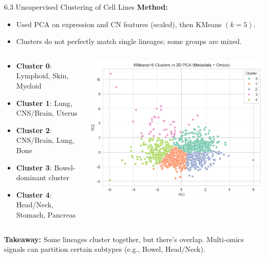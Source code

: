 \documentclass[10pt]{beamer}
\begin{document}
\begin{frame}{6.3 Unsupervised Clustering of Cell Lines}
  \textbf{Method:}
  \begin{itemize}
    \item Used PCA on expression and CN features (scaled), then KMeans \((k=5)\).
    \item Clusters do not perfectly match single lineages; some groups are mixed.
  \end{itemize}

  \begin{columns}
    \begin{column}{0.5\linewidth}
      \begin{itemize}
        \item \textbf{Cluster 0}: Lymphoid, Skin, Myeloid
        \item \textbf{Cluster 1}: Lung, CNS/Brain, Uterus
        \item \textbf{Cluster 2}: CNS/Brain, Lung, Bone
        \item \textbf{Cluster 3}: Bowel-dominant cluster
        \item \textbf{Cluster 4}: Head/Neck, Stomach, Pancreas
      \end{itemize}
    \end{column}
    \begin{column}{0.5\linewidth}
      \begin{center}
      \includegraphics[width=0.85\linewidth]{figs/kmeans_pca_plot.png}
      \end{center}
    \end{column}
  \end{columns}

  \vspace{0.3cm}
  \textbf{Takeaway:} Some lineages cluster together, but there's overlap. 
  Multi-omics signals can partition certain subtypes (e.g., Bowel, Head/Neck).
\end{frame}
\end{document}
